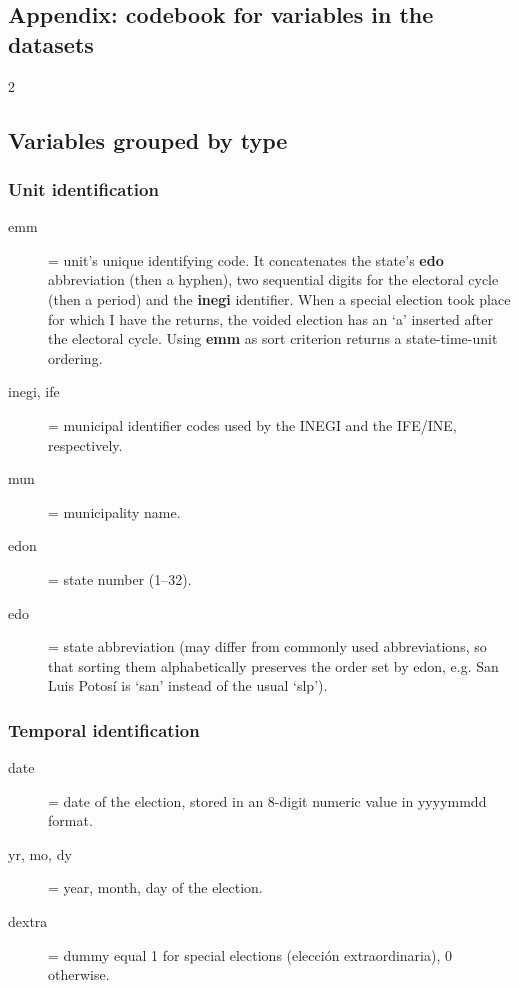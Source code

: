 \documentclass[letter,12pt]{article}
\begin{document}
\begin{singlespace}
  
\section{Appendix: codebook for variables in the datasets}

\begin{multicols}{2}
  
\begin{footnotesize}

\subsection{Variables grouped by type}
\subsubsection{Unit identification}
\begin{description}
\item[emm] = unit's unique identifying code. It concatenates the state's \textbf{edo} abbreviation (then a hyphen), two sequential digits for the electoral cycle (then a period) and the \textbf{inegi} identifier. When a special election took place for which I have the returns, the voided election has an `a' inserted after the electoral cycle. Using \textbf{emm} as sort criterion returns a state-time-unit ordering. 
\item[inegi, ife] = municipal identifier codes used by the INEGI and the IFE/INE, respectively.
\item[mun] = municipality name.
\item[edon] = state number (1--32).
\item[edo] = state abbreviation (may differ from commonly used abbreviations, so that sorting them alphabetically preserves the order set by edon, e.g. San Luis Potosí is `san' instead of the usual `slp').
\end{description}
\subsubsection{Temporal identification}
\begin{description}
\item[date] = date of the election, stored in an 8-digit numeric value in yyyymmdd format. 
\item[yr, mo, dy] = year, month, day of the election.
\item[dextra] = dummy equal 1 for special elections (elección extraordinaria), 0 otherwise.
\end{description}

\end{footnotesize}
\end{multicols}
\end{singlespace}
\end{document}
